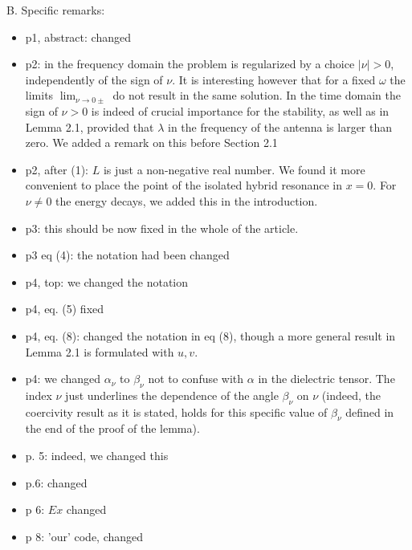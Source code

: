 \documentclass[a4paper,10pt]{article}
\begin{document}
B. Specific remarks: 
\begin{itemize}
\item p1, abstract: changed

\item p2: in the frequency domain  the problem is regularized by a choice $|\nu|>0$, independently of the sign of $\nu$. 
It is interesting however that for a fixed $\omega$ the limits $\lim_{\nu\rightarrow 0\pm}$ do not result in the same solution. 
In the time domain the sign of $\nu>0$ is indeed of crucial importance for the stability, as well as in Lemma 2.1, provided that $\lambda$ in the 
frequency of the antenna is larger than zero. We added a remark on this before Section 2.1  

\item p2, after (1): $L$ is just a non-negative real number. We found it more convenient to place the point of the isolated hybrid resonance in $x=0$.
For $\nu\neq 0$ the energy decays, we added this in the introduction.


\item p3: this should be now fixed in the whole of the article.

\item p3 eq (4): the notation had been changed
  
\item p4, top: we changed the notation  

\item p4, eq. (5) fixed

\item p4, eq. (8): changed the notation in eq (8), though a more general result in Lemma 2.1 is formulated with $u,v$. 

\item p4: we changed $\alpha_{\nu}$ to $\beta_{\nu}$ not to confuse with $\alpha$ in the dielectric tensor. The index $\nu$ 
just underlines the dependence of the angle $\beta_{\nu}$ on $\nu$ (indeed, the coercivity result as it is stated, holds for this specific value of $\beta_{\nu}$ defined 
in the end of the proof of the lemma).

\item p. 5: indeed, we changed this 

\item p.6:  changed

\item p 6: $Ex$ changed

\item p 8: 'our' code, changed


\end{itemize}
\end{document}
